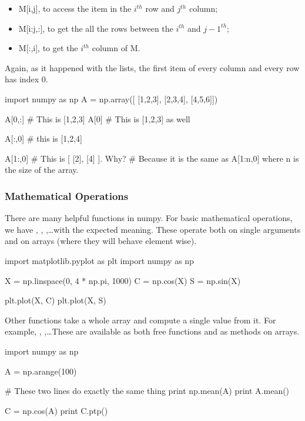 \begin{itemize}
 \item M[i,j], to access the item in the $i^{th}$ row and $j^{th}$ column; 
 \item M[i:j,:], to get the all the rows between the $i^{th}$ and $j-1^{th}$;
 \item M[:,i], to get the $i^{th}$ column of M.
\end{itemize}

Again, as it happened with the lists, the first item of every column and every row has index 0.

\begin{python}
import numpy as np
A = np.array([
    [1,2,3],
    [2,3,4],
    [4,5,6]])

A[0,:] # This is [1,2,3]
A[0] # This is [1,2,3] as well

A[:,0] # this is [1,2,4]

A[1:,0] # This is [ [2], [4] ]. Why?
        # Because it is the same as A[1:n,0] where n is the size of the array.
\end{python}

\subsubsection{Mathematical Operations}

There are many helpful functions in numpy. For basic mathematical operations, we have , , ,\ldots with the expected meaning. These operate both on single arguments and on arrays (where they will behave element wise).

\begin{python}
import matplotlib.pyplot as plt
import numpy as np

X = np.linspace(0, 4 * np.pi, 1000)
C = np.cos(X)
S = np.sin(X)

plt.plot(X, C)
plt.plot(X, S)
\end{python}

Other functions take a whole array and compute a single value from it. For example, , ,\ldots These are available as both free functions and as methods on arrays.

\begin{python}
import numpy as np

A = np.arange(100)

# These two lines do exactly the same thing
print np.mean(A)
print A.mean()

C = np.cos(A)
print C.ptp()
\end{python}

